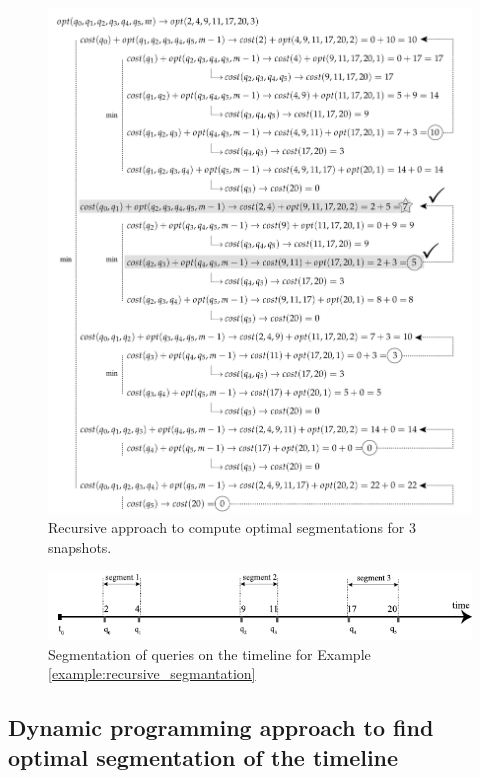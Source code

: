 			\begin{figure}
				\centering
				\includegraphics[width=\textwidth]{figs/recursion_example.pdf}
				\caption{Recursive approach to compute optimal segmentations for 3 snapshots.}
				\label{fig:example_recursive_steps}
			\end{figure}


			\begin{figure}
				\centering
				\includegraphics[width=\textwidth]{figs/example_recursive_s.pdf}
				\caption{Segmentation of queries on the timeline for Example \ref{example:recursive_segmantation}}
				\label{fig:example_recursive_segmentation}
			\end{figure}


		\subsection{Dynamic programming approach to find optimal segmentation of the timeline} \label{sec:dynamic_programming_optimal_segment}

